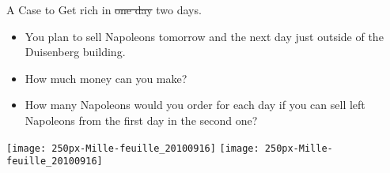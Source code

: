 \begin{exercise} A Case to  Get rich in \st{one day} two days. 

  \begin{itemize}
  \item You plan to sell Napoleons tomorrow and the next day just outside of the Duisenberg building.
  \item How much money can you make? 
  \item How many Napoleons would you order for each day if you can sell left Napoleons from the first day in the second one?
  \end{itemize}

   \texttt{[image: 250px-Mille-feuille\_20100916]}
   \texttt{[image: 250px-Mille-feuille\_20100916]}

\end{exercise}


